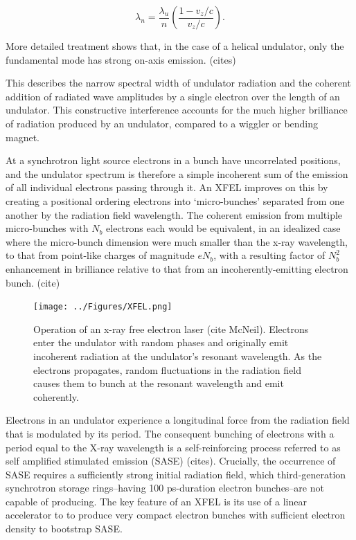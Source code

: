 \documentclass [11pt, proquest, article] {uwthesis}[2016/11/22]
\begin{document}
\begin{equation}
\lambda_n = \frac{\lambda_u}{n}(\frac{1 - v_z/c}{v_z/c}).
\end{equation}

More detailed treatment shows that, in the case of a helical undulator, only the fundamental mode has strong on-axis emission. (cites)

This describes the narrow spectral width of undulator radiation and the coherent addition of radiated wave amplitudes by a single electron over the length of an undulator. This constructive interference accounts for the much higher brilliance of radiation produced by an undulator, compared to a wiggler or bending magnet. 

At a synchrotron light source electrons in a bunch have uncorrelated positions, and the undulator spectrum is therefore a simple incoherent sum of the emission of all individual electrons passing through it. An XFEL improves on this by creating a positional ordering electrons into `micro-bunches' separated from one another by the radiation field wavelength. The coherent emission from multiple micro-bunches with $N_b$ electrons each would be equivalent, in an idealized case where the micro-bunch dimension were much smaller than the x-ray wavelength, to that from point-like charges of magnitude $e N_b$, with a resulting factor of $N_b^2$ enhancement in brilliance relative to that from an incoherently-emitting electron bunch. (cite)


\begin{figure}[h] 
\caption{Operation of an x-ray free electron laser (cite McNeil). Electrons enter the undulator with random phases and originally emit incoherent radiation at the undulator's resonant wavelength. As the electrons propagates, random fluctuations in the radiation field causes them to bunch at the resonant wavelength and emit coherently.}
\label{fig:xfel}
\centering
\texttt{[image: ../Figures/XFEL.png]}
\end{figure}

Electrons in an undulator experience a longitudinal force from the radiation field that is modulated by its period. The consequent bunching of electrons with a period equal to the X-ray wavelength is a self-reinforcing process referred to as self amplified stimulated emission (SASE) (cites). Crucially, the occurrence of SASE requires a sufficiently strong initial radiation field, which third-generation synchrotron storage rings--having 100 ps-duration electron bunches--are not capable of producing. The key feature of an XFEL is its use of a linear accelerator to to produce very compact electron bunches with sufficient electron density to bootstrap SASE.
\end{document}
